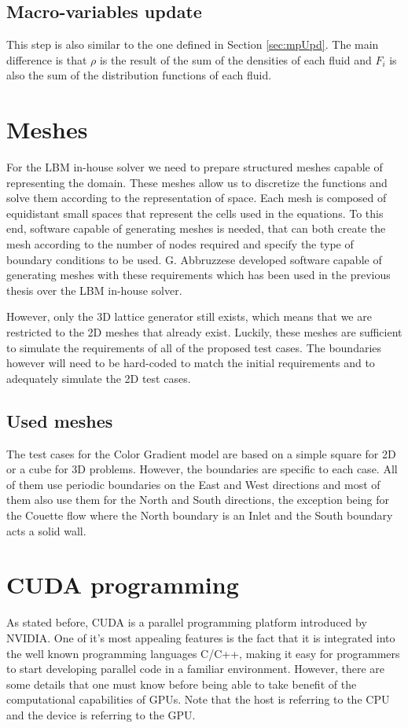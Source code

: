 \documentclass[12pt, openany]{book}
\begin{document}
\subsection{Macro-variables update}
This step is also similar to the one defined in Section \ref{sec:mpUpd}. The main difference is that $\rho$ is the result of the sum of the densities of each fluid and $F_i$ is also the sum of the distribution functions of each fluid. 
\section{Meshes}
For the LBM in-house solver we need to prepare structured meshes capable of representing the domain. These meshes allow us to discretize the functions and solve them according to the representation of space. Each mesh is composed of equidistant small spaces that represent the cells used in the equations. To this end, software capable of generating meshes is needed, that can both create the mesh according to the number of nodes required and specify the type of boundary conditions to be used. G. Abbruzzese developed software capable of generating meshes with these requirements \cite{abbru} which has been used in the previous thesis over the LBM in-house solver. \par
However, only the 3D lattice generator still exists, which means that we are restricted to the 2D meshes that already exist. Luckily, these meshes are sufficient to simulate the requirements of all of the proposed test cases. The boundaries however will need to be hard-coded to match the initial requirements and to adequately simulate the 2D test cases.
\subsection{Used meshes}
The test cases for the Color Gradient model are based on a simple square for 2D or a cube for 3D problems. However, the boundaries are specific to each case. All of them use periodic boundaries on the East and West directions and most of them also use them for the North and South directions, the exception being for the Couette flow where the North boundary is an Inlet and the South boundary acts a solid wall.
\section{CUDA programming}
As stated before, CUDA is a parallel programming platform introduced by NVIDIA. One of it's most appealing features is the fact that it is integrated into the well known programming languages C/C++, making it easy for programmers to start developing parallel code in a familiar environment. However, there are some details that one must know before being able to take benefit of the computational capabilities of GPUs. Note that the host is referring to the CPU and the device is referring to the GPU.
\end{document}
